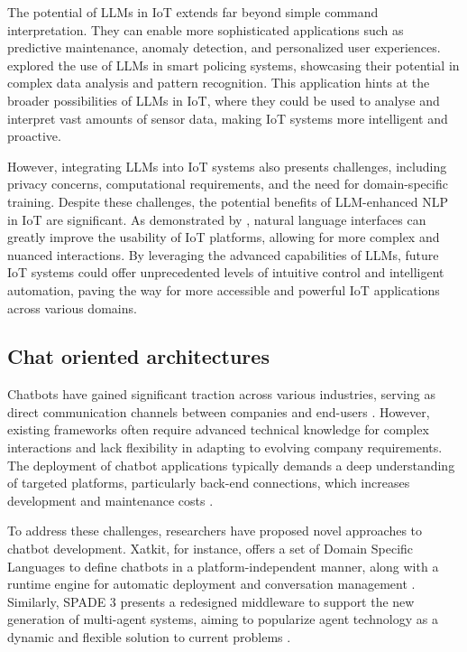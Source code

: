 \documentclass[lettersize,journal]{IEEEtran}
\begin{document}
The potential of LLMs in IoT extends far beyond simple command interpretation. They can enable more sophisticated applications such as predictive maintenance, anomaly detection, and personalized user experiences. \citet{10538107} explored the use of LLMs in smart policing systems, showcasing their potential in complex data analysis and pattern recognition. This application hints at the broader possibilities of LLMs in IoT, where they could be used to analyse and interpret vast amounts of sensor data, making IoT systems more intelligent and proactive.

However, integrating LLMs into IoT systems also presents challenges, including privacy concerns, computational requirements, and the need for domain-specific training. Despite these challenges, the potential benefits of LLM-enhanced NLP in IoT are significant. As demonstrated by \citet{9808139}, natural language interfaces can greatly improve the usability of IoT platforms, allowing for more complex and nuanced interactions. By leveraging the advanced capabilities of LLMs, future IoT systems could offer unprecedented levels of intuitive control and intelligent automation, paving the way for more accessible and powerful IoT applications across various domains.

\subsection{Chat oriented architectures}
Chatbots have gained significant traction across various industries, serving as direct communication channels between companies and end-users \cite{8960373}. However, existing frameworks often require advanced technical knowledge for complex interactions and lack flexibility in adapting to evolving company requirements. The deployment of chatbot applications typically demands a deep understanding of targeted platforms, particularly back-end connections, which increases development and maintenance costs \cite{8960373}.

To address these challenges, researchers have proposed novel approaches to chatbot development. Xatkit, for instance, offers a set of Domain Specific Languages to define chatbots in a platform-independent manner, along with a runtime engine for automatic deployment and conversation management \cite{8960373}. Similarly, SPADE 3 presents a redesigned middleware to support the new generation of multi-agent systems, aiming to popularize agent technology as a dynamic and flexible solution to current problems \cite{9207929}. 
\end{document}
